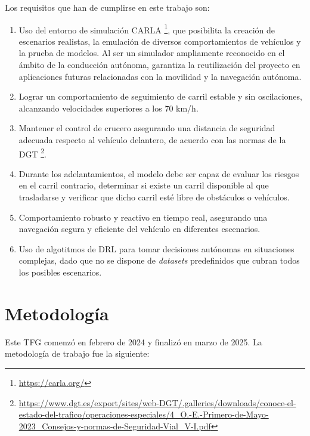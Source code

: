 Los requisitos que han de cumplirse en este trabajo son: 
\begin{enumerate}
    \item Uso del entorno de simulación CARLA \footnote{\url{https://carla.org/}}, que posibilita la creación de escenarios realistas, la emulación de diversos comportamientos de vehículos y la prueba de modelos. Al ser un simulador ampliamente reconocido en el ámbito de la conducción autónoma, garantiza la reutilización del proyecto en aplicaciones futuras relacionadas con la movilidad y la navegación autónoma.
    \item Lograr un comportamiento de seguimiento de carril estable y sin oscilaciones, alcanzando velocidades superiores a los 70 km/h.
    \item Mantener el control de crucero asegurando una distancia de seguridad adecuada respecto al vehículo delantero, de acuerdo con las normas de la \ac{DGT} \footnote{\url{https://www.dgt.es/export/sites/web-DGT/.galleries/downloads/conoce-el-estado-del-trafico/operaciones-especiales/4_O.-E.-Primero-de-Mayo-2023_Consejos-y-normas-de-Seguridad-Vial_V-I.pdf}}.
   \item Durante los adelantamientos, el modelo debe ser capaz de evaluar los riesgos en el carril contrario, determinar si existe un carril disponible al que trasladarse y verificar que dicho carril esté libre de obstáculos o vehículos.
    \item Comportamiento robusto y reactivo en tiempo real, asegurando una navegación segura y eficiente del vehículo en diferentes escenarios.
    \item Uso de algotitmos de \ac{DRL} para tomar decisiones autónomas en situaciones complejas, dado que no se dispone de \textit{datasets} predefinidos que cubran todos los posibles escenarios.
\end{enumerate}

\section{Metodología}
\label{sec:metodologia}

Este TFG comenzó en febrero de 2024 y finalizó en marzo de 2025. La metodología de trabajo fue la siguiente:

